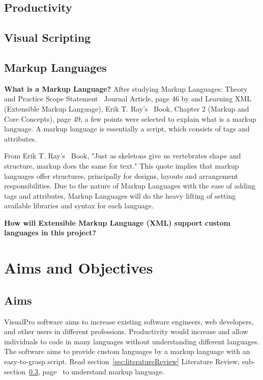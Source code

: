 \documentclass[conference]{IEEEtran}
\begin{document}
      \subsection{Productivity}
      \subsection{Visual Scripting}
      \subsection{Markup Languages}
      \label{subsec:lr-markupLanguages}
        \textbf{What is a Markup Language?}
          After studying Markup Languages: Theory and Practice Scope Statement~\cite{noauthor_markup_1999} Journal Article, page 46 by and Learning XML (Extensible Markup Language), Erik T. Ray's~\cite{ray_learning_nodate} Book, Chapter 2 (Markup and Core Concepts), page 49, a few points were selected to explain what is a markup language. A markup language is essentially a script, which consists of tags and attributes. 

          From Erik T. Ray's~\cite{ray_learning_nodate} Book, "Just as skeletons give us vertebrates shape and structure, markup does the same for text." This quote implies that markup languages offer structures, principally for designs, layouts and arrangement responsibilities. Due to the nature of Markup Languages with the ease of adding tags and attributes, Markup Languages will do the heavy lifting of setting available libraries and syntax for each language.

        \textbf{How will Extensible Markup Language (XML) support custom languages in this project?}

    \section{Aims and Objectives}
      \subsection{Aims}
        VisualPro software aims to increase existing software engineers, web developers, and other users in different professions. Productivity would increase and allow individuals to code in many languages without understanding different languages. The software aims to provide custom languages by a markup language with an easy-to-grasp script. Read section~\ref{sec:literatureReview} Literature Review, sub-section~\ref{subsec:lr-markupLanguages}, page~\pageref{subsec:lr-markupLanguages} to understand markup language.
\end{document}
